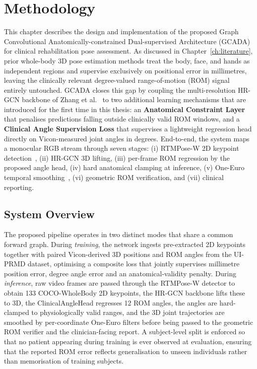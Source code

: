 \chapter{Methodology}
\label{ch:methodology}

This chapter describes the design and implementation of the proposed
Graph Convolutional Anatomically-constrained Dual-supervised Architecture
(GCADA) for clinical rehabilitation pose assessment. As discussed in
Chapter~\ref{ch:literature}, prior whole-body 3D pose estimation methods
treat the body, face, and hands as independent regions and supervise
exclusively on positional error in millimetres, leaving the clinically
relevant degree-valued range-of-motion (ROM) signal entirely untouched.
GCADA closes this gap by coupling the multi-resolution HR-GCN backbone
of Zhang et al.~\cite{zhang2025hrgcn} to two additional learning
mechanisms that are introduced for the first time in this thesis: an
\textbf{Anatomical Constraint Layer} that penalises predictions falling
outside clinically valid ROM windows, and a \textbf{Clinical Angle
Supervision Loss} that supervises a lightweight regression head directly
on Vicon-measured joint angles in degrees. End-to-end, the system maps
a monocular RGB stream through seven stages: (i) RTMPose-W 2D keypoint
detection~\cite{jiang2023rtmpose}, (ii) HR-GCN 3D lifting, (iii) per-frame
ROM regression by the proposed angle head, (iv) hard anatomical clamping
at inference, (v) One-Euro temporal smoothing~\cite{casiez2012euro},
(vi) geometric ROM verification, and (vii) clinical reporting.

\section{System Overview}
\label{sec:system-overview}

The proposed pipeline operates in two distinct modes that share a
common forward graph. During \emph{training}, the network ingests
pre-extracted 2D keypoints together with paired Vicon-derived 3D
positions and ROM angles from the UI-PRMD dataset, optimising a
composite loss that jointly supervises millimetre position error,
degree angle error and an anatomical-validity penalty. During
\emph{inference}, raw video frames are passed through the RTMPose-W
detector to obtain 133 COCO-WholeBody 2D keypoints, the HR-GCN
backbone lifts these to 3D, the ClinicalAngleHead regresses 12 ROM
angles, the angles are hard-clamped to physiologically valid ranges,
and the 3D joint trajectories are smoothed by per-coordinate One-Euro
filters before being passed to the geometric ROM verifier and the
clinician-facing report. A subject-level split is enforced so that no
patient appearing during training is ever observed at evaluation,
ensuring that the reported ROM error reflects generalisation to unseen
individuals rather than memorisation of training subjects.

